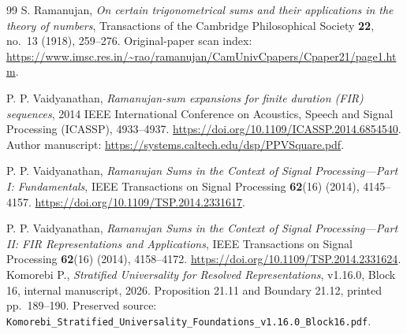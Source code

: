 \begin{thebibliography}{99}
S. Ramanujan,
\emph{On certain trigonometrical sums and their applications in the theory of numbers},
Transactions of the Cambridge Philosophical Society \textbf{22}, no.~13 (1918), 259--276.
Original-paper scan index: \url{https://www.imsc.res.in/~rao/ramanujan/CamUnivCpapers/Cpaper21/page1.htm}.

P. P. Vaidyanathan,
\emph{Ramanujan-sum expansions for finite duration (FIR) sequences},
2014 IEEE International Conference on Acoustics, Speech and Signal Processing (ICASSP), 4933--4937.
\url{https://doi.org/10.1109/ICASSP.2014.6854540}.
Author manuscript: \url{https://systems.caltech.edu/dsp/PPVSquare.pdf}.

P. P. Vaidyanathan,
\emph{Ramanujan Sums in the Context of Signal Processing---Part I: Fundamentals},
IEEE Transactions on Signal Processing \textbf{62}(16) (2014), 4145--4157.
\url{https://doi.org/10.1109/TSP.2014.2331617}.

P. P. Vaidyanathan,
\emph{Ramanujan Sums in the Context of Signal Processing---Part II: FIR Representations and Applications},
IEEE Transactions on Signal Processing \textbf{62}(16) (2014), 4158--4172.
\url{https://doi.org/10.1109/TSP.2014.2331624}.
Komorebi P.,
\emph{Stratified Universality for Resolved Representations},
v1.16.0, Block 16, internal manuscript, 2026.
Proposition 21.11 and Boundary 21.12, printed pp.~189--190.
Preserved source: \texttt{Komorebi\_Stratified\_Universality\_Foundations\_v1.16.0\_Block16.pdf}.
\end{thebibliography}
